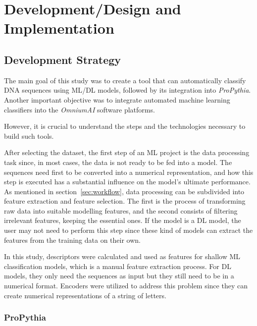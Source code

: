 \chapter{Development/Design and Implementation}\label{cha:dev}

\section{Development Strategy}

The main goal of this study was to create a tool that can automatically classify \gls{DNA} sequences using \gls{ML}/\gls{DL} models, followed by its integration into \textit{ProPythia}. Another important objective was to integrate automated machine learning classifiers into the \textit{OmniumAI} software platforms.

However, it is crucial to understand the steps and the technologies necessary to build such tools.

After selecting the dataset, the first step of an \gls{ML} project is the data processing task since, in most cases, the data is not ready to be fed into a model. The sequences need first to be converted into a numerical representation, and how this step is executed has a substantial influence on the model's ultimate performance. 
As mentioned in section~\ref{sec:workflow}, data processing can be subdivided into feature extraction and feature selection. The first is the process of transforming raw data into suitable modelling features, and the second consists of filtering irrelevant features, keeping the essential ones. If the model is a \gls{DL} model, the user may not need to perform this step since these kind of models can extract the features from the training data on their own.

In this study, descriptors were calculated and used as features for shallow \gls{ML} classification models, which is a manual feature extraction process. For \gls{DL} models, they only need the sequences as input but they still need to be in a numerical format. Encoders were utilized to address this problem since they can create numerical representations of a string of letters.


\subsection{ProPythia}

